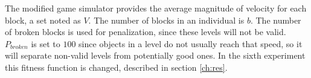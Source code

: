\documentclass[sigconf]{acmart}
\begin{document}
The modified 
game simulator provides the average magnitude of
velocity for each block, %
a set noted as $V$. %
The number of blocks in an individual is $b$.
The number of broken blocks is 
used for penalization, since these levels will not be valid. 
$P_{broken}$ is set to $100$ since objects in a level do not usually reach that 
speed, so it will separate non-valid levels from potentially good ones.
In the sixth experiment this fitness function is changed,
described in section \ref{ch:res}.
\end{document}
